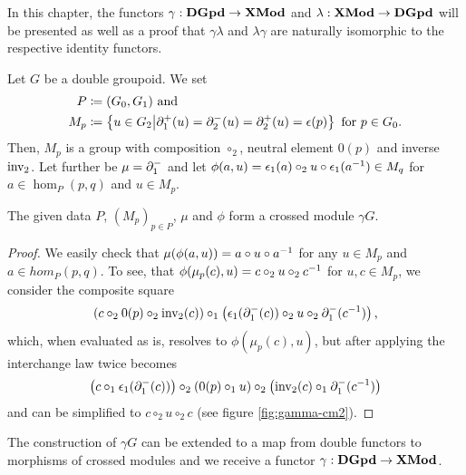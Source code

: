 In this chapter, the functors $\gamma : \mathbf{DGpd} \to \mathbf{XMod}$ and
$\lambda : \mathbf{XMod} \to \mathbf{DGpd}$ will be presented as well as a proof that $\gamma \lambda$
and $\lambda \gamma$ are naturally isomorphic to the respective identity functors.

\begin{lemma}
Let $G$ be a double groupoid. We set
\begin{align*}
P &\coloneqq (G_0,G_1) \text{ and } \\
M_p &\coloneqq \left\{ u \in G_2 \middle| \partial^+_1(u) = \partial^-_2(u) = \partial^+_2(u) = \epsilon(p) \right\}
	\text{ for $p \in G_0$.}
\end{align*}
Then, $M_p$ is a group with composition $\circ_2$, neutral element $0(p)$ and
inverse $\operatorname{inv_2}$.
Let further be $\mu = \partial^-_1$ and let $\phi(a,u) =
\epsilon_1(a) \circ_2 u \circ \epsilon_1(a^{-1}) \in M_q$ for $a \in \hom_P(p,q)$
and $u \in M_p$.

The given data $P$, $(M_p)_{p \in P}$, $\mu$ and $\phi$ form a crossed module $\gamma G$.
\end{lemma}

\begin{proof}
We easily check that $\mu(\phi(a,u)) = a \circ u \circ a^{-1}$ for any $u \in M_p$
and $a \in hom_P(p,q)$.
To see, that $\phi(\mu_p(c),u) = c \circ_2 u \circ_2 c^{-1}$ for $u,c \in M_p$,
we consider the composite square
\begin{equation*}
\left(c \circ_2 0(p) \circ_2 \operatorname{inv_2}(c)\right) \circ_1
	\left(\epsilon_1(\partial^-_1(c)) \circ_2 u \circ_2 \partial^-_1(c^{-1})\right) \text{,}
\end{equation*}
which, when evaluated as is, resolves to $\phi(\mu_p(c),u)$, but after applying
the interchange law twice becomes
\begin{equation*}
\left(c \circ_1 \epsilon_1(\partial^-_1(c))\right)
	\circ_2 \left(0(p) \circ_1 u\right)
	\circ_2 \left(\operatorname{inv_2}(c) \circ_1 \partial^-_1(c^{-1})\right)
\end{equation*}
and can be simplified to $c \circ_2 u \circ_2 c$ (see figure \ref{fig:gamma-cm2}).
\end{proof}

\begin{defn}
The construction of $\gamma G$ can be extended to a map from double functors to
morphisms of crossed modules and we receive a functor $\gamma : \mathbf{DGpd} \to \mathbf{XMod}$.
\end{defn}

